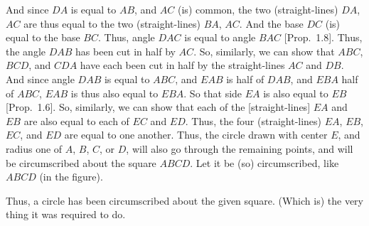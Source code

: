 \begin{Parallel}{}{}
{\epsfysize=2.2in
\centerline{}

And since $DA$ is equal to $AB$, and $AC$ (is) common, the two (straight-lines)
$DA$, $AC$ are thus equal to the two (straight-lines) $BA$, $AC$. And the base $DC$
(is) equal to the base $BC$. Thus, angle $DAC$ is equal to angle $BAC$ [Prop.~1.8]. Thus, the angle $DAB$ has been cut in half by $AC$. So, similarly,
we can show that $ABC$, $BCD$, and $CDA$ have each been cut in half
by the straight-lines $AC$ and $DB$. And since angle $DAB$ is equal
 to $ABC$, and $EAB$ is half of $DAB$, and $EBA$ half of $ABC$, $EAB$ is thus
 also equal to $EBA$. So that side $EA$ is also equal to  $EB$ [Prop.~1.6]. So, similarly, we can show that each of the [straight-lines] $EA$ and $EB$ are also equal to each of $EC$ and $ED$. Thus, the four (straight-lines)
 $EA$, $EB$, $EC$, and $ED$ are equal to one another. Thus, the circle drawn with
 center $E$, and radius one of $A$, $B$, $C$, or $D$, will also go through the remaining points, and will be circumscribed about the square $ABCD$. Let
 it be (so) circumscribed, like $ABCD$ (in the figure).
 
 Thus, a circle has been circumscribed about the given square.
 (Which is) the very thing it was required to do.}
\end{Parallel}

